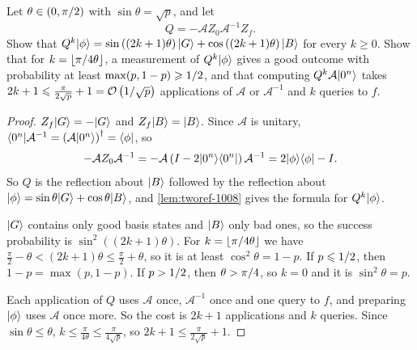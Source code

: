 \begin{exercisebox}
\begin{exercise}\label{ex:ampamp-1008}\label{thm:ampamp-1008}
    Let $\theta \in (0, \pi/2)$ with $\sin\theta = \sqrt{p}$, and let
    \[Q = -\mathcal{A} Z_0 \mathcal{A}^{-1} Z_f.\]
    Show that
    $Q^k\lvert \phi \rangle = \sin\left((2k+1)\theta\right)\lvert G \rangle + \cos\left((2k+1)\theta\right)\lvert B \rangle$
    for every $k \geq 0$. Show that for $k = \floor{\sfrac{\pi}{4\theta}}$, a measurement of
    $Q^k\lvert \phi \rangle$ gives a good outcome with probability at least $\max(p, 1 - p) \geqslant 1/2$,
    and that computing $Q^k \mathcal{A}\lvert 0^n \rangle$ takes
    $2k + 1 \leqslant \frac{\pi}{2\sqrt{p}} + 1 = \mathcal{O}\left(1/\sqrt{p}\right)$ applications of $\mathcal{A}$ or
    $\mathcal{A}^{-1}$ and $k$ queries to $f$.
\end{exercise}
\tcblower
\begin{proof}
    $Z_f\lvert G \rangle = -\lvert G \rangle$ and $Z_f\lvert B \rangle = \lvert B \rangle$. Since $\mathcal{A}$ is unitary,
    $\langle 0^n \rvert\mathcal{A}^{-1} = \left(\mathcal{A}\lvert 0^n \rangle\right)^\dagger = \langle \phi \rvert$, so
    \[-\mathcal{A} Z_0 \mathcal{A}^{-1} = -\mathcal{A}\left(I - 2\lvert 0^n \rangle\langle 0^n \rvert\right)\mathcal{A}^{-1}
        = 2\lvert \phi \rangle\langle \phi \rvert - I.\]
    So $Q$ is the reflection about $\lvert B \rangle$ followed by the reflection about
    $\lvert \phi \rangle = \sin\theta\lvert G \rangle + \cos\theta\lvert B \rangle$, and \cref{lem:tworef-1008} gives the formula
    for $Q^k\lvert \phi \rangle$.

    $\lvert G \rangle$ contains only good basis states and $\lvert B \rangle$ only bad ones, so the success
    probability is $\sin^2((2k+1)\theta)$. For $k = \floor{\sfrac{\pi}{4\theta}}$ we have
    $\frac{\pi}{2} - \theta < (2k+1)\theta \leq \frac{\pi}{2} + \theta$, so it is at least
    $\cos^2\theta = 1 - p$. If $p \leqslant 1/2$, then $1 - p = \max(p, 1-p)$. If
    $p > 1/2$, then $\theta > \pi/4$, so $k = 0$ and it is $\sin^2\theta = p$.

    Each application of $Q$ uses $\mathcal{A}$ once, $\mathcal{A}^{-1}$ once and one query to $f$, and
    preparing $\lvert \phi \rangle$ uses $\mathcal{A}$ once more. So the cost is $2k + 1$ applications and
    $k$ queries. Since $\sin\theta \leq \theta$, $k \leq \frac{\pi}{4\theta} \leq \frac{\pi}{4\sqrt{p}}$,
    so $2k + 1 \leq \frac{\pi}{2\sqrt{p}} + 1$.
\end{proof}
\end{exercisebox}
